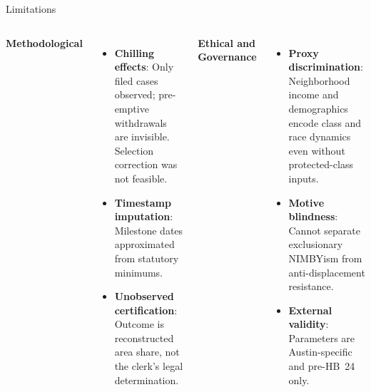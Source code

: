 \documentclass[10pt, aspectratio=169]{beamer}
\begin{document}
\begin{frame}{Limitations}
    \begin{columns}
        \textbf{Methodological}
        \begin{itemize}
            \item \textbf{Chilling effects}: Only filed cases observed; pre-emptive withdrawals are invisible. Selection correction was not feasible.
            \item \textbf{Timestamp imputation}: Milestone dates approximated from statutory minimums.
            \item \textbf{Unobserved certification}: Outcome is reconstructed area share, not the clerk's legal determination.
        \end{itemize}

        \textbf{Ethical and Governance}
        \begin{itemize}
            \item \textbf{Proxy discrimination}: Neighborhood income and demographics encode class and race dynamics even without protected-class inputs.
            \item \textbf{Motive blindness}: Cannot separate exclusionary NIMBYism from anti-displacement resistance.
            \item \textbf{External validity}: Parameters are Austin-specific and pre-HB~24 only.
        \end{itemize}
    \end{columns}
\end{frame}
\end{document}
